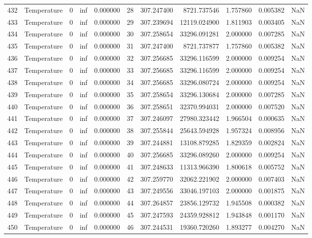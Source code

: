 \begin{tabular}{llrrrrrrrrr}
432 & Temperature & 0 & inf & 0.000000 & 28 & 307.247400 & 8721.737546 & 1.757860 & 0.005382 & NaN \\
433 & Temperature & 0 & inf & 0.000000 & 29 & 307.239694 & 12119.024900 & 1.811903 & 0.003405 & NaN \\
434 & Temperature & 0 & inf & 0.000000 & 30 & 307.258654 & 33296.091281 & 2.000000 & 0.007285 & NaN \\
435 & Temperature & 0 & inf & 0.000000 & 31 & 307.247400 & 8721.737877 & 1.757860 & 0.005382 & NaN \\
436 & Temperature & 0 & inf & 0.000000 & 32 & 307.256685 & 33296.116599 & 2.000000 & 0.009254 & NaN \\
437 & Temperature & 0 & inf & 0.000000 & 33 & 307.256685 & 33296.116599 & 2.000000 & 0.009254 & NaN \\
438 & Temperature & 0 & inf & 0.000000 & 34 & 307.256685 & 33296.080724 & 2.000000 & 0.009254 & NaN \\
439 & Temperature & 0 & inf & 0.000000 & 35 & 307.258654 & 33296.130684 & 2.000000 & 0.007285 & NaN \\
440 & Temperature & 0 & inf & 0.000000 & 36 & 307.258651 & 32370.994031 & 2.000000 & 0.007520 & NaN \\
441 & Temperature & 0 & inf & 0.000000 & 37 & 307.246097 & 27980.323442 & 1.966504 & 0.000635 & NaN \\
442 & Temperature & 0 & inf & 0.000000 & 38 & 307.255844 & 25643.594928 & 1.957324 & 0.008956 & NaN \\
443 & Temperature & 0 & inf & 0.000000 & 39 & 307.244881 & 13108.879285 & 1.829359 & 0.002824 & NaN \\
444 & Temperature & 0 & inf & 0.000000 & 40 & 307.256685 & 33296.089260 & 2.000000 & 0.009254 & NaN \\
445 & Temperature & 0 & inf & 0.000000 & 41 & 307.248633 & 11313.966390 & 1.800618 & 0.005752 & NaN \\
446 & Temperature & 0 & inf & 0.000000 & 42 & 307.259770 & 32062.221902 & 2.000000 & 0.007403 & NaN \\
447 & Temperature & 0 & inf & 0.000000 & 43 & 307.249556 & 33046.197103 & 2.000000 & 0.001875 & NaN \\
448 & Temperature & 0 & inf & 0.000000 & 44 & 307.264857 & 23856.129732 & 1.945508 & 0.000382 & NaN \\
449 & Temperature & 0 & inf & 0.000000 & 45 & 307.247593 & 24359.928812 & 1.943848 & 0.001170 & NaN \\
450 & Temperature & 0 & inf & 0.000000 & 46 & 307.244531 & 19360.720260 & 1.893277 & 0.004270 & NaN \\

\end{tabular}
